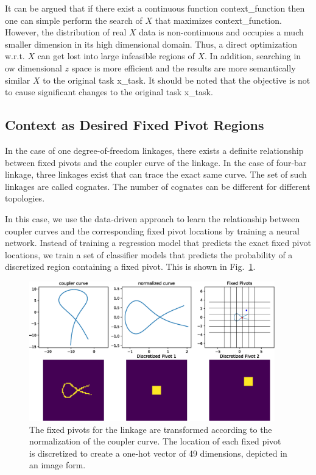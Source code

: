 It can be argued that if there exist a continuous function \ac{context_function} then one can simple perform the search of $X$ that maximizes \ac{context_function}. However, the distribution of real $X$ data is non-continuous and occupies a much smaller dimension in its high dimensional domain. Thus, a direct optimization w.r.t. $X$ can get lost into large infeasible regions of $X$. In addition, searching in ow dimensional $z$ space is more efficient and the results are more semantically similar $X$ to the original task \ac{x_task}. It should be noted that the objective is not to cause significant changes to the original task \ac{x_task}.  

\subsection{Context as Desired Fixed Pivot Regions}
In the case of one degree-of-freedom linkages, there exists a definite relationship between fixed pivots and the coupler curve of the linkage. In the case of four-bar linkage, three linkages exist that can trace the exact same curve. The set of such linkages are called cognates. The number of cognates can be different for different topologies.

In this case, we use the data-driven approach to learn the relationship between coupler curves and the corresponding fixed pivot locations by training a neural network. Instead of training a regression model that predicts the exact fixed pivot locations, we train a set of classifier models that predicts the probability of a discretized region containing a fixed pivot. This is shown in Fig.~\ref{fig_fix_pivot_discretization}.

\begin{figure}
\centering
\includegraphics[width=0.95\textwidth]{idetc-20/figure/fig_fix_pivot_discretization.eps}
  \caption{The fixed pivots for the linkage are transformed according to the normalization of the coupler curve. The location of each fixed pivot is discretized to create a one-hot vector of 49 dimensions, depicted in an image form.}
\label{fig_fix_pivot_discretization}
\end{figure}

